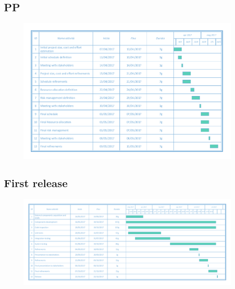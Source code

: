 \documentclass[english]{article}
\begin{document}
		\begin{landscape}
	\subsection{PP}
		\begin{figure}[H]
			\centering
			\includegraphics[scale=0.6]{./Images/4-PPGantt.pdf} 
		\end{figure}
		\end{landscape}
		\begin{landscape}
	\subsection{First release}
		\begin{figure}[H]
			\centering
			\includegraphics[scale=0.725]{./Images/5-FirstRelease18.pdf} 
		\end{figure}
		\end{landscape}
\end{document}
